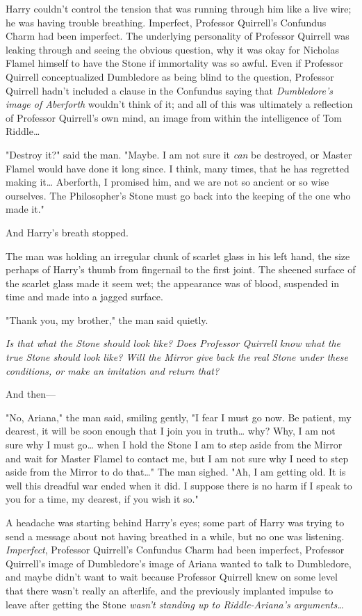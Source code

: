 Harry couldn't control the tension that was running through him like a live 
wire; he was having trouble breathing. Imperfect, Professor Quirrell's 
Confundus Charm had been imperfect. The underlying personality of Professor 
Quirrell was leaking through and seeing the obvious question, why it was okay 
for Nicholas Flamel himself to have the Stone if immortality was so awful. Even 
if Professor Quirrell conceptualized Dumbledore as being blind to the question, 
Professor Quirrell hadn't included a clause in the Confundus saying that 
\emph{Dumbledore's image of Aberforth} wouldn't think of it; and all of this 
was ultimately a reflection of Professor Quirrell's own mind, an image from 
within the intelligence of Tom Riddle{\ldots}

"Destroy it?" said the man. "Maybe. I am not sure it \emph{can} be destroyed, 
or Master Flamel would have done it long since. I think, many times, that he 
has regretted making it{\ldots} Aberforth, I promised him, and we are not so 
ancient or so wise ourselves. The Philosopher's Stone must go back into the 
keeping of the one who made it."

And Harry's breath stopped.

The man was holding an irregular chunk of scarlet glass in his left hand, the 
size perhaps of Harry's thumb from fingernail to the first joint. The sheened 
surface of the scarlet glass made it seem wet; the appearance was of blood, 
suspended in time and made into a jagged surface.

"Thank you, my brother," the man said quietly.

\emph{Is that what the Stone should look like? Does Professor Quirrell know 
what the true Stone should look like? Will the Mirror give back the real Stone 
under these conditions, or make an imitation and return that?}

And then---

"No, Ariana," the man said, smiling gently, "I fear I must go now. Be patient, 
my dearest, it will be soon enough that I join you in truth{\ldots} why? Why, I 
am not sure why I must go{\ldots} when I hold the Stone I am to step aside from 
the Mirror and wait for Master Flamel to contact me, but I am not sure why I 
need to step aside from the Mirror to do that{\ldots}" The man sighed. "Ah, I 
am getting old. It is well this dreadful war ended when it did. I suppose there 
is no harm if I speak to you for a time, my dearest, if you wish it so."

A headache was starting behind Harry's eyes; some part of Harry was trying to 
send a message about not having breathed in a while, but no one was listening. 
\emph{ Imperfect}, Professor Quirrell's Confundus Charm had been imperfect, 
Professor Quirrell's image of Dumbledore's image of Ariana wanted to talk to 
Dumbledore, and maybe didn't want to wait because Professor Quirrell knew on 
some level that there wasn't really an afterlife, and the previously implanted 
impulse to leave after getting the Stone \emph{wasn't standing up to 
Riddle-Ariana's arguments{\ldots}}

